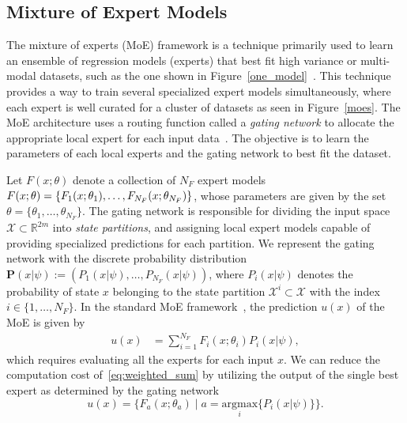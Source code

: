 \subsection{Mixture of Expert Models}
\label{ssec:mixture_of_experts}


The mixture of experts (MoE) framework is a technique primarily used to learn an
ensemble of regression models (experts) that best fit high variance or
multi-modal datasets, such as the one shown in
Figure~\ref{one_model}~\cite{bishop2006pattern}.
%
This technique provides a way to train several specialized expert models
simultaneously, where each expert is well curated for a cluster of datasets as
seen in Figure~\ref{moes}.
%
The MoE architecture uses a routing function called a \textit{gating network} to
allocate the appropriate local expert for each input
data~\cite{harkonen2022mixtures}.
%
The objective is to learn the parameters of each local experts and the gating
network to best fit the dataset.
%

Let $F(x; \theta)$ denote a collection of $N_F$ expert models $F(x;\theta) =
\{F_1(x; \theta_1), \dots, \\ F_{N_{F}}(x; \theta_{N_F})\}$, whose parameters
are given by the set $\theta=\{\theta_1, \dots, \theta_{N_{F}} \}$.
%
The gating network is responsible for dividing the input space $\mathcal{X}
\subset \mathbb{R}^{2m}$ into \textit{state partitions}, and assigning local expert
models capable of providing specialized predictions for each partition.
%
%
We represent the gating network with the discrete probability distribution
$\mathbf{P}(x| \psi) := (P_1(x| \psi), \dots, P_{N_F}(x| \psi))$, where $P_i(x |
\psi)$ denotes the probability of state $x$ belonging to the state partition
$\mathcal{X}^i \subset \mathcal{X}$ with the index $i \in \{1, \dots, N_F \}$. 
%
%
%
In the standard MoE framework~\cite{jordan1994hierarchical}, the prediction
$u(x)$ of the MoE is given by
\begin{align}
  u(x) &= \sum_{i=1}^{N_F}F_i(x; \theta_i)P_i(x | \psi),
  \label{eq:weighted_sum}
\end{align}
%
which requires evaluating all the experts for each input $x$.
%
We can reduce the computation cost of~\eqref{eq:weighted_sum} by utilizing the
output of the single best expert as determined by the gating
network\cite{chen2022towards}
\begin{equation}
    u(x) = \{ F_a(x; \theta_a) \; | \; a = \underset{i}{\textrm{argmax}} \{ P_i(x | \psi) \} \}.
  \label{eq:best_expert_prediction}
\end{equation}
%

